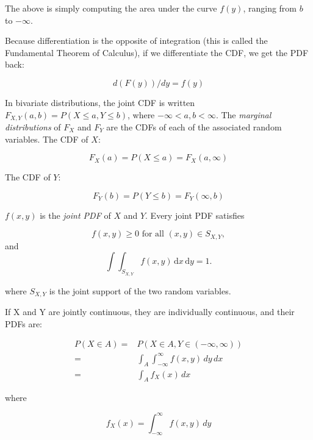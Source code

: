 \documentclass[12pt,]{krantz}
\begin{document}
The above is simply computing the area under the curve \(f(y)\), ranging from \(b\) to \(-\infty\).

Because differentiation is the opposite of integration (this is called the Fundamental Theorem of Calculus), if we differentiate the CDF, we get the PDF back:

\begin{equation}
d(F(y))/dy=f(y)
\end{equation}

In bivariate distributions, the joint CDF is written \(F_{X,Y}(a,b)=P(X\leq a, Y\leq b)\), where \(-\infty < a,b<\infty\). The \emph{marginal distributions} of \(F_X\) and \(F_Y\) are the CDFs of each of the associated random variables. The CDF of \(X\):

\begin{equation}
F_X(a) = P(X\leq a) = F_X(a,\infty) 
\end{equation}

The CDF of \(Y\):

\begin{equation}
F_Y(b) = P(Y\leq b) = F_Y(\infty,b) 
\end{equation}

\(f(x,y)\) is the \emph{joint PDF} of \(X\) and \(Y\). Every joint PDF satisfies

\begin{equation}
f(x,y)\geq 0\mbox{ for all }(x,y)\in S_{X,Y},
\end{equation}
and
\begin{equation}
\int \int_{S_{X,Y}}f(x,y)\,\mathrm{d} x\,\mathrm{d} y=1.
\end{equation}

where \(S_{X,Y}\) is the joint support of the two random variables.

If X and Y are jointly continuous, they are individually continuous, and their PDFs are:

\begin{equation}
\begin{split}
P(X\in A) = & P(X\in A, Y\in (-\infty,\infty))  \\
= & \int_A \int_{-\infty}^{\infty} f(x,y)\,dy\, dx\\
= & \int_A f_X(x)\, dx
\end{split} 
\end{equation}

\noindent
where

\begin{equation}
f_X(x) = \int_{-\infty}^{\infty} f(x,y)\, dy    
\end{equation}
\end{document}
